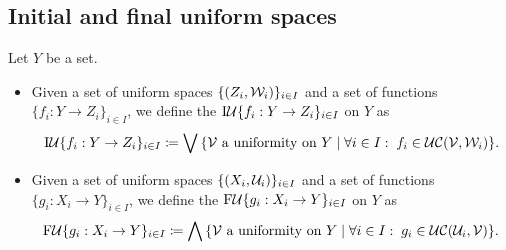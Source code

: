 \subsection{Initial and final uniform spaces}
\begin{definition}
Let $Y$ be a set.
\begin{itemize}
\item Given a set of uniform spaces $\{\sSet{Z_i, \mathcal{W}_i}\}_{i\in I}$ and a set of functions $\{f_i: Y\to Z_i\}_{i\in I}$, we define the  $\operatorname{I\mathcal{U}}\{f_i: Y\to Z_i\}_{i\in I}$ on $Y$ as
\[ \initialUniformity\{f_i: Y\to Z_i\}_{i\in I} \defeq \bigvee \setbuilder{\text{$\mathcal{V}$ a uniformity on $Y$}}{\forall i\in I:\; f_i\in \ucont(\mathcal{V}, \mathcal{W}_i)}. \]
\item Given a set of uniform spaces $\{\sSet{X_i, \mathcal{U}_i}\}_{i\in I}$ and a set of functions $\{g_i: X_i\to Y\}_{i\in I}$, we define the  $\operatorname{F\mathcal{U}}\{g_i: X_i\to Y\}_{i\in I}$ on $Y$ as
\[ \finalUniformity\{g_i: X_i\to Y\}_{i\in I} \defeq \bigwedge \setbuilder{\text{$\mathcal{V}$ a uniformity on $Y$}}{\forall i\in I:\; g_i\in \ucont(\mathcal{U}_i, \mathcal{V})}. \]
\end{itemize}
\end{definition}

